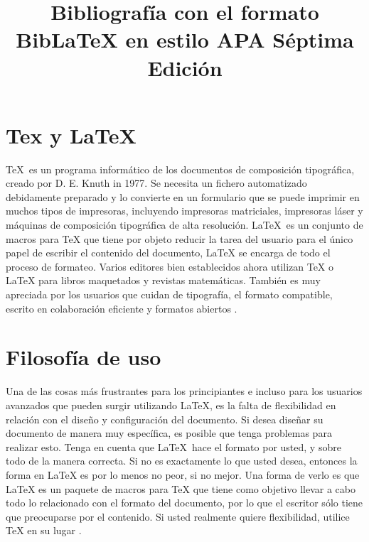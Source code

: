 \documentclass[12pt,letterpaper,jou]{apa7} %
\title{Bibliografía con el formato BibLaTeX en estilo APA Séptima Edición}
\begin{document}


\maketitle

\section{Tex y LaTeX} %
	
\TeX\ es un programa informático de los documentos de composición tipográfica, creado por D. E. Knuth in 1977. Se necesita un fichero automatizado debidamente preparado y lo convierte en un formulario que se puede imprimir en muchos tipos de impresoras, incluyendo impresoras matriciales, impresoras láser y máquinas de composición tipográfica de alta resolución. \LaTeX\ es un conjunto de macros para TeX que tiene por objeto reducir la tarea del usuario para el único papel de escribir el contenido del documento, LaTeX se encarga de todo el proceso de formateo. Varios editores bien establecidos ahora utilizan TeX o LaTeX para libros maquetados y revistas matemáticas. También es muy apreciada por los usuarios que cuidan de tipografía, el formato compatible, escrito en colaboración eficiente y formatos abiertos \autocite{goossens_latex_1994}. 
	
\section{Filosofía de uso} %
	
Una de las cosas más frustrantes para los principiantes e incluso para los usuarios avanzados que pueden surgir utilizando LaTeX, es la falta de flexibilidad en relación con el diseño y configuración del documento. Si desea diseñar su documento de manera muy específica, es posible que tenga problemas para realizar esto. Tenga en cuenta que LaTeX\ hace el formato por usted, y sobre todo de la manera correcta. Si no es exactamente lo que usted desea, entonces la forma en LaTeX es por lo menos no peor, si no mejor. Una forma de verlo es que LaTeX es un paquete de macros para TeX que tiene como objetivo llevar a cabo todo lo relacionado con el formato del documento, por lo que el escritor sólo tiene que preocuparse por el contenido. Si usted realmente quiere flexibilidad, utilice TeX en su lugar \autocite{pan_tutorial_1995}.
	
\end{document}
